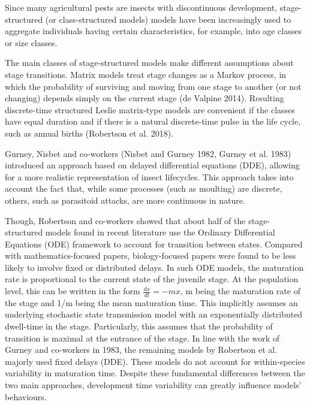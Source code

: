 \documentclass[12pt,a4paper,onecolumn]{article}
\begin{document}
\tabto{1 cm}Since many agricultural pests are insects with discontinuous development, stage-structured (or class-structured models) models have been increasingly used to aggregate individuals having certain characteristics, for example, into age classes or size classes. 

\tabto{1 cm}The main classes of stage-structured models make different assumptions about stage transitions. Matrix models treat stage changes as a Markov process, in which the probability of surviving and moving from one stage to another (or not changing) depends simply on the current stage (de Valpine 2014). Resulting discrete-time structured Leslie matrix-type models are convenient if the classes have equal duration and if there is a natural discrete-time pulse in the life cycle, such as annual births (Robertson et al. 2018). 

\tabto{1 cm} Gurney, Nisbet and co-workers (Nisbet and Gurney 1982, Gurney et al. 1983) introduced an approach based on delayed differential equations (DDE), allowing for a more realistic representation of insect lifecycles. This approach takes into account the fact that, while some processes (such as moulting) are discrete, others, such as parasitoid attacks, are more continuous in nature.

\tabto{1 cm}Though, Robertson and co-workers showed that about half of the stage-structured models found in recent literature use the Ordinary Differential Equations (ODE) framework to account for transition between states. Compared with mathematics-focused papers, biology-focused papers were found to be less likely to involve fixed or distributed delays. In such ODE models, the maturation rate is proportional to the current state of the juvenile stage. At the population level, this can be written in the form $\frac{dx}{dt} = -mx$, m being the maturation rate of the stage and 1/m being the mean maturation time. This implicitly assumes an underlying stochastic state transmission model with an exponentially distributed dwell-time in the stage. Particularly, this assumes that the probability of transition is maximal at the entrance of the stage. In line with the work of Gurney and co-workers in 1983, the remaining models by Robertson et al. majorly used fixed delays (DDE). These models do not account for within-species variability in maturation time.  Despite these fundamental differences between the two main approaches, development time variability can greatly influence models' behaviours. 
\end{document}

